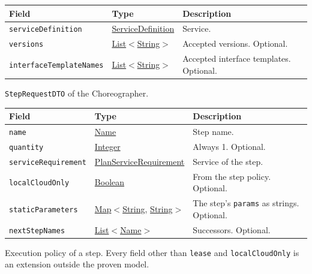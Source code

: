 \documentclass[a4paper]{arrowhead}
\newcommand{\mref}[1]{{\textcolor{ArrowheadPurple}{\hyperref[sec:model:#1]{#1}}}}
\newcommand{\pref}[1]{{\textcolor{ArrowheadGrey}{\hyperref[sec:model:primitives:#1]{#1}}}}
\begin{document}
{\small
\begin{longtable}{|p{3.9cm}|p{4.4cm}|p{7.5cm}|}

\hline
\rowcolor{gray!33} Field & Type & Description \\ \hline
\endhead
\texttt{serviceDefinition} & \pref{ServiceDefinition} & Service. \\ \hline
\texttt{versions} & \pref{List}$<$\pref{String}$>$ & Accepted versions. Optional. \\ \hline
\texttt{interfaceTemplateNames} & \pref{List}$<$\pref{String}$>$ & Accepted interface templates. Optional. \\ \hline
\end{longtable}
}

\texttt{StepRequestDTO} of the Choreographer.

{\small
\begin{longtable}{|p{3.9cm}|p{4.4cm}|p{7.5cm}|}

\hline
\rowcolor{gray!33} Field & Type & Description \\ \hline
\endhead
\texttt{name} & \pref{Name} & Step name. \\ \hline
\texttt{quantity} & \pref{Integer} & Always 1. Optional. \\ \hline
\texttt{serviceRequirement} & \mref{PlanServiceRequirement} & Service of the step. \\ \hline
\texttt{localCloudOnly} & \pref{Boolean} & From the step policy. Optional. \\ \hline
\texttt{staticParameters} & \pref{Map}$<$\pref{String}, \pref{String}$>$ & The step's \texttt{params} as strings. Optional. \\ \hline
\texttt{nextStepNames} & \pref{List}$<$\pref{Name}$>$ & Successors. Optional. \\ \hline
\end{longtable}
}

Execution policy of a step. Every field other than \texttt{lease} and \texttt{localCloudOnly} is an extension outside the proven model.
\end{document}
